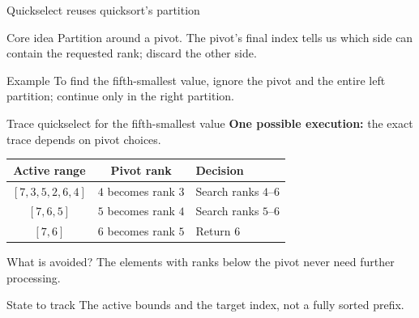 \documentclass[aspectratio=169]{beamer}
\begin{document}
\begin{frame}{Quickselect reuses quicksort's partition}
  \begin{block}{Core idea}
    Partition around a pivot. The pivot's final index tells us which side can
    contain the requested rank; discard the other side.
  \end{block}
  \begin{center}
  \end{center}
  \begin{exampleblock}{Example}
    To find the fifth-smallest value, ignore the pivot and the entire left
    partition; continue only in the right partition.
  \end{exampleblock}
\end{frame}

\begin{frame}{Trace quickselect for the fifth-smallest value}
  \small
  \textbf{One possible execution:} the exact trace depends on pivot choices.
  \begin{center}
    \begin{tabular}{ccl}
      \toprule
      \textbf{Active range} & \textbf{Pivot rank} & \textbf{Decision} \\
      \midrule
      $[7,3,5,2,6,4]$ & $4$ becomes rank $3$ & Search ranks $4$--$6$ \\
      $[7,6,5]$ & $5$ becomes rank $4$ & Search ranks $5$--$6$ \\
      $[7,6]$ & $6$ becomes rank $5$ & Return $6$ \\
      \bottomrule
    \end{tabular}
  \end{center}
  \begin{alertblock}{What is avoided?}
    The elements with ranks below the pivot never need further processing.
  \end{alertblock}
  \begin{block}{State to track}
    The active bounds and the target index, not a fully sorted prefix.
  \end{block}
\end{frame}
\end{document}
